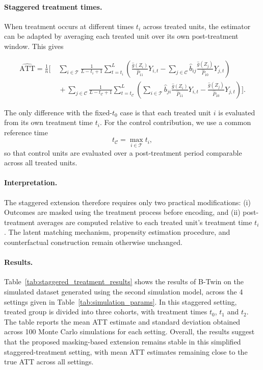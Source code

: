 \documentclass[10pt]{article} %
\begin{document}
{\paragraph{Staggered treatment times.}
When treatment occurs at different times $t_i$ across treated units, the estimator can be adapted by averaging each treated unit over its own post-treatment window. This gives}
{
\begin{align}
\hat{\mathrm{ATT}} =
\frac{1}{n}
\Bigg[
&\;
\sum_{i \in \mathcal{T}}
\frac{1}{L-t_i+1}
\sum_{t=t_i}^{L}
\left(
\frac{\hat g(Z_i)}{\hat{ P}_{11}} Y_{i,t}
-
\sum_{j \in \mathcal{C}} \hat b_{ij}\frac{\hat g(Z_j)}{\hat{ P}_{10}} Y_{j,t}
\right)
\nonumber\\
&\;+
\sum_{j \in \mathcal{C}}
\frac{1}{L-t_{\mathcal C}+1}
\sum_{t=t_{\mathcal C}}^{L}
\left(
\sum_{i \in \mathcal{T}} \hat b_{ji}\frac{\hat g(Z_i)}{\hat{ P}_{11}} Y_{i,t}
-
\frac{\hat g(Z_j)}{\hat{ P}_{10}} Y_{j,t}
\right)
\Bigg].
\label{eq:estimator_staggered_appendix}
\end{align}}

{
The only difference with the fixed-$t_0$ case is that each treated unit $i$ is evaluated from its own treatment time $t_i$. For the control contribution, we use a common reference time
\[
t_{\mathcal C} = \max_{i \in \mathcal{T}} t_i,
\]
so that control units are evaluated over a post-treatment period comparable across all treated units.}

{\paragraph{Interpretation.}
The staggered extension therefore requires only two practical modifications:
(i) Outcomes are masked using the treatment process before encoding, and
(ii) post-treatment averages are computed relative to each treated unit’s treatment time $t_i$.
The latent matching mechanism, propensity estimation procedure, and counterfactual construction remain otherwise unchanged.
}
{\paragraph{Results.} Table~\ref{tab:staggered_treatment_results} shows the results of B-Twin on the simulated dataset generated using the second simulation model, across the 4 settings given in Table~\ref{tab:simulation_params}. In this staggered setting, treated group is divided into three cohorts, with treatment times $t_0$, $t_1$ and $t_2$.  The table reports the mean ATT estimate and standard deviation obtained across 100 Monte Carlo simulations for each setting. Overall, the results suggest that the proposed masking-based extension remains stable in this simplified staggered-treatment setting, with mean ATT estimates remaining close to the true ATT across all settings. }
\end{document}
